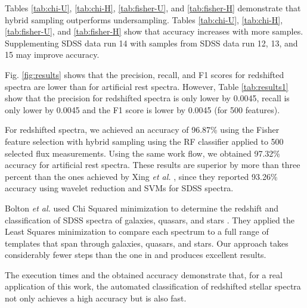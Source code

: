 \documentclass[conference]{IEEEtran}
\begin{document}
	Tables \ref{tab:chi-U}, \ref{tab:chi-H}, \ref{tab:fisher-U}, and \ref{tab:fisher-H} demonstrate that hybrid sampling outperforms undersampling. Tables \ref{tab:chi-U}, \ref{tab:chi-H}, \ref{tab:fisher-U}, and \ref{tab:fisher-H} show that accuracy increases with more samples. Supplementing SDSS data run 14 with samples from SDSS data run 12, 13, and 15 may improve accuracy.

	Fig. \ref{fig:results} shows that the precision, recall, and F1 scores for redshifted spectra are lower than for artificial rest spectra. However, Table \ref{tab:results1} show that the precision for redshifted spectra is only lower by 0.0045, recall is only lower by 0.0045 and the F1 score is lower by 0.0045 (for 500 features).  

	For redshifted spectra, we achieved an accuracy of 96.87\% using the Fisher feature selection with hybrid sampling using the RF classifier applied to 500 selected flux measurements. Using the same work flow, we obtained 97.32\% accuracy for artificial rest spectra. These results are superior by more than three percent than the ones achieved by Xing \textit{et al.} \cite{Xing}, since they reported 93.26\% accuracy using wavelet reduction and SVMs for SDSS spectra. 
	
Bolton \textit{et al.} used Chi Squared minimization to determine the redshift and classification of SDSS spectra of galaxies, quasars, and stars \cite{Bolton}. They applied the Least Squares minimization to compare each spectrum to a full range of templates that span through galaxies, quasars, and stars. Our approach takes considerably fewer steps than the one in \cite{Bolton} and produces excellent results. 


The execution times and the obtained accuracy demonstrate that, for a real application of this work, the automated classification of redshifted stellar spectra not only achieves a high accuracy but is also fast. 

\end{document}
